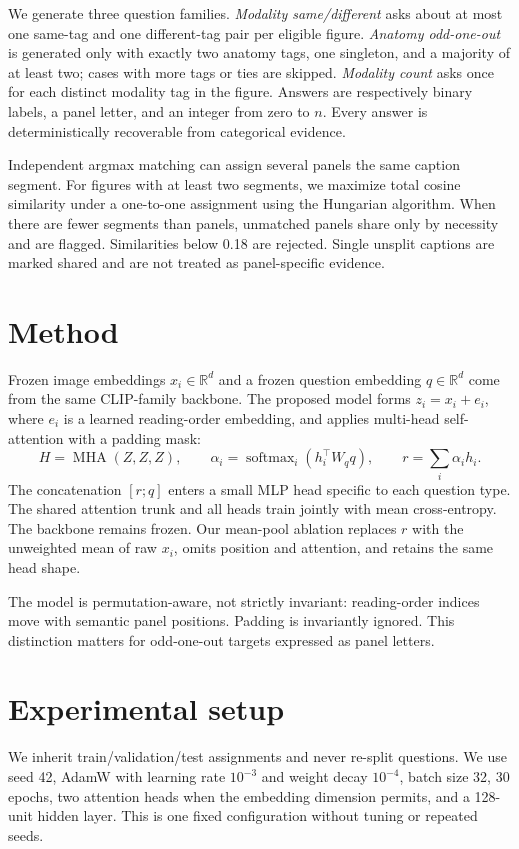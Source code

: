 \documentclass{article}
\begin{document}
We generate three question families. \emph{Modality same/different} asks about at most one same-tag and one different-tag pair per eligible figure. \emph{Anatomy odd-one-out} is generated only with exactly two anatomy tags, one singleton, and a majority of at least two; cases with more tags or ties are skipped. \emph{Modality count} asks once for each distinct modality tag in the figure. Answers are respectively binary labels, a panel letter, and an integer from zero to $n$. Every answer is deterministically recoverable from categorical evidence.

Independent argmax matching can assign several panels the same caption segment. For figures with at least two segments, we maximize total cosine similarity under a one-to-one assignment using the Hungarian algorithm. When there are fewer segments than panels, unmatched panels share only by necessity and are flagged. Similarities below 0.18 are rejected. Single unsplit captions are marked shared and are not treated as panel-specific evidence.

\section{Method}
Frozen image embeddings $x_i\in\mathbb{R}^d$ and a frozen question embedding $q\in\mathbb{R}^d$ come from the same CLIP-family backbone. The proposed model forms $z_i=x_i+e_i$, where $e_i$ is a learned reading-order embedding, and applies multi-head self-attention with a padding mask:
\begin{equation}
H=\operatorname{MHA}(Z,Z,Z),\qquad
\alpha_i=\operatorname{softmax}_i\left(h_i^\top W_q q\right),\qquad
r=\sum_i\alpha_i h_i.
\end{equation}
The concatenation $[r;q]$ enters a small MLP head specific to each question type. The shared attention trunk and all heads train jointly with mean cross-entropy. The backbone remains frozen. Our mean-pool ablation replaces $r$ with the unweighted mean of raw $x_i$, omits position and attention, and retains the same head shape.

The model is permutation-aware, not strictly invariant: reading-order indices move with semantic panel positions. Padding is invariantly ignored. This distinction matters for odd-one-out targets expressed as panel letters.

\section{Experimental setup}
We inherit train/validation/test assignments and never re-split questions. We use seed 42, AdamW with learning rate $10^{-3}$ and weight decay $10^{-4}$, batch size 32, 30 epochs, two attention heads when the embedding dimension permits, and a 128-unit hidden layer. This is one fixed configuration without tuning or repeated seeds.
\end{document}
